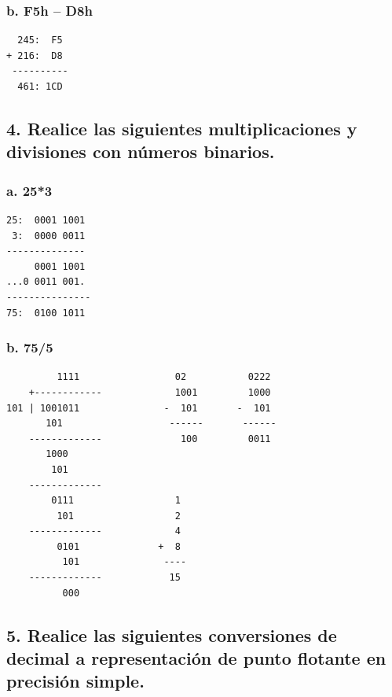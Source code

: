\documentclass[12pt]{article}
\begin{document}
\subsubsection*{b. F5h – D8h}
\label{sec:org4eb277a}
\begin{verbatim}
  245:  F5
+ 216:  D8
 ----------
  461: 1CD
\end{verbatim}

\subsection*{4. Realice las siguientes multiplicaciones y divisiones con números binarios.}
\label{sec:org60234b7}
\subsubsection*{a. 25*3}
\label{sec:orga1df99a}
\begin{verbatim}
25:  0001 1001
 3:  0000 0011
--------------
     0001 1001
...0 0011 001.
---------------
75:  0100 1011  
\end{verbatim}

\subsubsection*{b. 75/5}
\label{sec:orgc86a666}
\begin{verbatim}
         1111                 02           0222
    +------------             1001         1000
101 | 1001011               -  101       -  101  
       101                   ------       ------    
    -------------              100         0011
       1000
        101
    -------------
        0111                  1
         101                  2
    -------------             4
         0101              +  8
          101               ----
    -------------            15 
          000
\end{verbatim}

\subsection*{5. Realice las siguientes conversiones de decimal a representación de punto flotante en precisión simple.}
\label{sec:org996e8c7}
\end{document}
